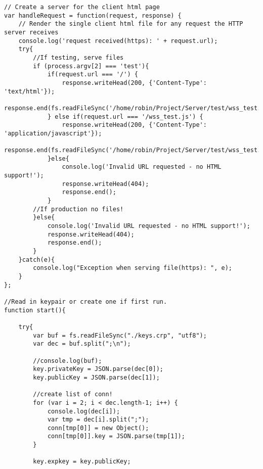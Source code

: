 \begin{lstlisting}[caption=ACS Server, style=htmlcssjs]
// Create a server for the client html page
var handleRequest = function(request, response) {
    // Render the single client html file for any request the HTTP server receives
    console.log('request received(https): ' + request.url);
    try{
    	//If testing, serve files
    	if (process.argv[2] === 'test'){
	    	if(request.url === '/') {
	            response.writeHead(200, {'Content-Type': 'text/html'});
		        response.end(fs.readFileSync('/home/robin/Project/Server/test/wss_test.html'));
	        } else if(request.url === '/wss_test.js') {
		    	response.writeHead(200, {'Content-Type': 'application/javascript'});
		        response.end(fs.readFileSync('/home/robin/Project/Server/test/wss_test.js'));
		    }else{
	        	console.log('Invalid URL requested - no HTML support!');
		        response.writeHead(404);
		        response.end();
		    }
		//If production no files!
		}else{
			console.log('Invalid URL requested - no HTML support!');
		    response.writeHead(404);
		    response.end();
		}
    }catch(e){
        console.log("Exception when serving file(https): ", e);
    }
};

//Read in keypair or create one if first run.
function start(){
	
	try{
		var buf = fs.readFileSync("./keys.crp", "utf8");
		var dec = buf.split(";\n");

		//console.log(buf);
		key.privateKey = JSON.parse(dec[0]);
		key.publicKey = JSON.parse(dec[1]);

		//create list of conn!
		for (var i = 2; i < dec.length-1; i++) {
			console.log(dec[i]);
			var tmp = dec[i].split(";");
			conn[tmp[0]] = new Object();
			conn[tmp[0]].key = JSON.parse(tmp[1]);
		}

		key.expkey = key.publicKey;


\end{lstlisting}
